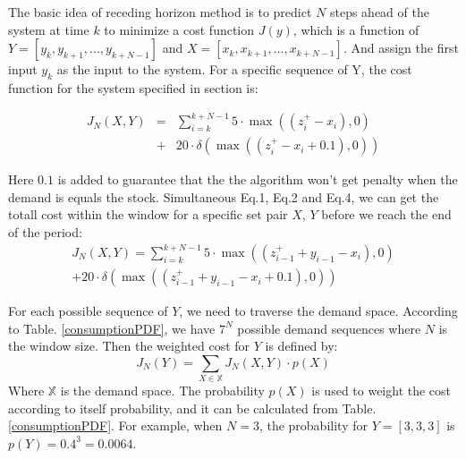 \documentclass[letterpaper, 10 pt, conference]{ieeeconf}
\begin{document}
The basic idea of receding horizon method is to predict $N$ steps ahead of the system at time $k$ to minimize a cost function $J(y)$, which is a function of $Y = [{y_k, y_{k+1},...,y_{k+N-1}}]$ and $X=[{x_k, x_{k+1},...,x_{k+N-1}}]$. And assign the first input $y_k$ as the input to the system. For a specific sequence of Y, the cost function for the system specified in section \uppercase\expandafter{} is:
\begin{small}
\begin{equation}
  \begin{array}{rcl}
    J_N(X,Y) &=&  \sum \limits_{i = k}^{k+N-1} 5\cdot \max\left(\left(z_i^+-x_i\right),0\right) \\
    &+& 20\cdot \delta\left(
    \max\left(\left(z_i^+-x_i+0.1\right),0\right)\right)
  \end{array}
\end{equation}
\end{small}
Here $0.1$ is added to guarantee that the the algorithm won't get penalty when the demand is equals the stock. Simultaneous Eq.1, Eq.2 and Eq.4, we can get the totall cost within the window for a specific set pair $X$, $Y$ before we reach the end of the period:
\begin{equation}
  \begin{array}{rcl}
    J_N(X,Y) = \sum \limits_{i = k}^{k+N-1} 5\cdot \max\left(\left(z_{i-1}^+
    + y_{i-1}-x_i\right),0\right) \\
    + 20\cdot \delta\left(\max\left(\left(z_{i-1}^+ + y_{i-1}-x_i+0.1\right),0\right)\right)
  \end{array}
\end{equation}

For each possible sequence of $Y$, we need to traverse the demand space. According to Table. \ref{consumptionPDF}, we have $7^N$ possible demand sequences where $N$ is the window size. Then the weighted cost for $Y$ is defined by:
\begin{equation}
    J_N(Y) = \sum \limits_{X \in \mathbb{X}} J_N(X,Y) \cdot p(X)
\end{equation}
Where $\mathbb{X}$ is the demand space. The probability $p(X)$ is used to weight the cost according to itself probability, and it can be calculated from Table. \ref{consumptionPDF}. For example, when $N = 3$, the probability for $Y = [3,3,3]$ is $p(Y) = 0.4^3 = 0.0064$.
\end{document}
